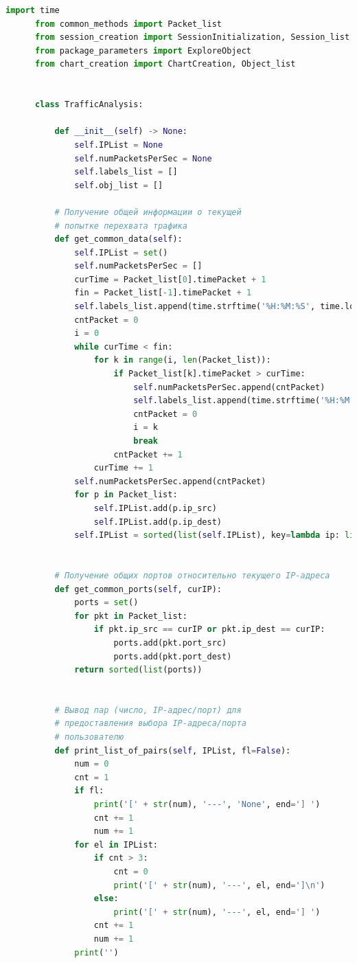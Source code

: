 \documentclass[bachelor, och, coursework]{SCWorks}
\begin{document}
    \begin{lstlisting}[language=Python]
      import time
      from common_methods import Packet_list
      from session_creation import SessionInitialization, Session_list
      from package_parameters import ExploreObject
      from chart_creation import ChartCreation, Object_list
      
      
      class TrafficAnalysis:
      
          def __init__(self) -> None:
              self.IPList = None
              self.numPacketsPerSec = None
              self.labels_list = []
              self.obj_list = []
      
          # Получение общей информации о текущей
          # попытке перехвата трафика
          def get_common_data(self):
              self.IPList = set()
              self.numPacketsPerSec = []
              curTime = Packet_list[0].timePacket + 1
              fin = Packet_list[-1].timePacket + 1
              self.labels_list.append(time.strftime('%H:%M:%S', time.localtime(Packet_list[0].timePacket)))
              cntPacket = 0
              i = 0
              while curTime < fin:
                  for k in range(i, len(Packet_list)):
                      if Packet_list[k].timePacket > curTime:
                          self.numPacketsPerSec.append(cntPacket)
                          self.labels_list.append(time.strftime('%H:%M:%S', time.localtime(curTime)))
                          cntPacket = 0
                          i = k
                          break
                      cntPacket += 1
                  curTime += 1
              self.numPacketsPerSec.append(cntPacket)
              for p in Packet_list:
                  self.IPList.add(p.ip_src)
                  self.IPList.add(p.ip_dest)
              self.IPList = sorted(list(self.IPList), key=lambda ip: list(map(int, ip.split('.'))))
          
      
          # Получение общих портов относительно текущего IP-адреса
          def get_common_ports(self, curIP):
              ports = set()
              for pkt in Packet_list:
                  if pkt.ip_src == curIP or pkt.ip_dest == curIP:
                      ports.add(pkt.port_src)
                      ports.add(pkt.port_dest)
              return sorted(list(ports))
      
      
          # Вывод пар (число, IP-адрес/порт) для
          # предоставления выбора IP-адреса/порта
          # пользователю
          def print_list_of_pairs(self, IPList, fl=False):
              num = 0
              cnt = 1
              if fl:
                  print('[' + str(num), '---', 'None', end='] ')
                  cnt += 1
                  num += 1
              for el in IPList:
                  if cnt > 3:
                      cnt = 0
                      print('[' + str(num), '---', el, end=']\n')
                  else:
                      print('[' + str(num), '---', el, end='] ')
                  cnt += 1
                  num += 1
              print('')
      

\end{lstlisting}
\end{document}
